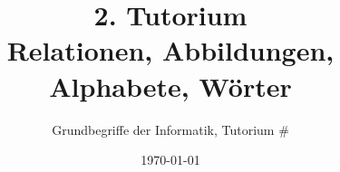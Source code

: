 



\title[Relationen, Abbildungen, Alphabete, Wörter]{2. Tutorium\\ Relationen, Abbildungen, Alphabete, Wörter}
\subtitle{Grundbegriffe der Informatik, Tutorium \#\mytutnumber}
\date{\today}


\titleframe
\roadmap



	
